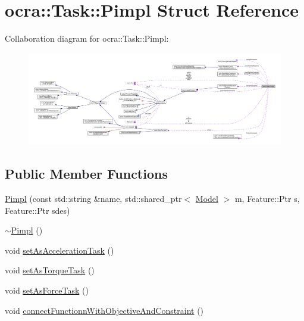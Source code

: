 \hypertarget{structocra_1_1Task_1_1Pimpl}{}\section{ocra\+:\+:Task\+:\+:Pimpl Struct Reference}
\label{structocra_1_1Task_1_1Pimpl}


Collaboration diagram for ocra\+:\+:Task\+:\+:Pimpl\+:\nopagebreak
\begin{figure}[H]
\begin{center}
\leavevmode
\includegraphics[width=350pt]{df/da6/structocra_1_1Task_1_1Pimpl__coll__graph}
\end{center}
\end{figure}
\subsection*{Public Member Functions}
\begin{DoxyCompactItemize}
\item 
\hyperlink{structocra_1_1Task_1_1Pimpl_a3d7faa7e6fa107d07e079823df57b07e}{Pimpl} (const std\+::string \&name, std\+::shared\+\_\+ptr$<$ \hyperlink{classocra_1_1Model}{Model} $>$ m, Feature\+::\+Ptr s, Feature\+::\+Ptr sdes)
\item 
\hyperlink{structocra_1_1Task_1_1Pimpl_ae00df5386f25d40f820ef4bc1296ea4a}{$\sim$\+Pimpl} ()
\item 
void \hyperlink{structocra_1_1Task_1_1Pimpl_a1b06484c1ce60c68a20df0369bdb8221}{set\+As\+Acceleration\+Task} ()
\item 
void \hyperlink{structocra_1_1Task_1_1Pimpl_ab5bfb5126aa62de5e77c49c65711f0c2}{set\+As\+Torque\+Task} ()
\item 
void \hyperlink{structocra_1_1Task_1_1Pimpl_a6591dc9a28cc7cc30473559600bf5cb6}{set\+As\+Force\+Task} ()
\item 
void \hyperlink{structocra_1_1Task_1_1Pimpl_aabf390e84dff086a53ea876fad5755c5}{connect\+Functionn\+With\+Objective\+And\+Constraint} ()
\end{DoxyCompactItemize}
